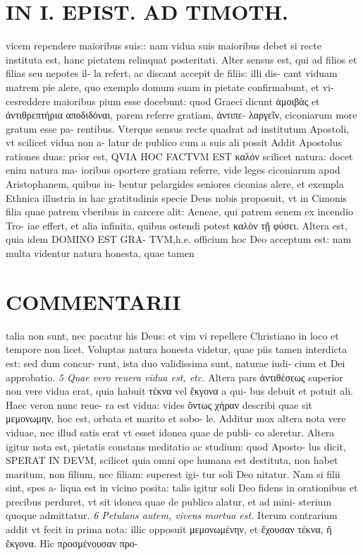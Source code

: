 \documentclass{article}
\begin{document}
\begin{pages}
\section*{IN I. EPIST. AD TIMOTH. }
\marginpar{[ p.123 ]}\pstart vicem rependere maioribus suis:: nam vidua suis maioribus debet si recte instituta est, hanc pietatem relinquat posteritati. Alter sensus est, qui ad filios et filias seu nepotes il- la refert, ac discant accepit de filiis: illi dis- cant viduam matrem pie alere, quo exemplo domum suam in pietate confirmabunt, et vi- cesreddere maioribus pium esse docebunt: quod Graeci dicunt ἁμοιβὰς et ἀντιθρεπτήρια αποδιδόναι, parem referre gratiam, ἀντιπε- λαργεῖν, ciconiarum more gratum esse pa- rentibus. Vterque sensus recte quadrat ad institutum Apostoli, vt scilicet vidua non a- latur de publico cum a suis ali possit  \pend\pstart Addit Apostolus rationes duas: prior est, QVIA HOC FACTVM EST καλόν scilicet natura: docet enim natura ma- ioribus oportere gratiam referre, vide leges ciconiarum apud Aristophanem, quibus iu- bentur pelargides seniores ciconias alere, et exempla Ethnica illustria in hac gratitudinis specie Deus nobis proposuit, vt in Cimonis filia quae patrem vberibus in carcere alit: Aeneae, qui patrem senem ex incendio Tro- iae effert, et alia infinita, quibus ostendi potest καλὸν τῇ φύσει.  \pend\pstart Altera est, quia idem DOMINO EST GRA- TVM,h.e. officium hoc Deo acceptum est: nam multa videntur natura honesta, quae tamen  \pend
\section*{COMMENTARII }
\marginpar{[ p.124 ]}\pstart talia non sunt, nec pacatur his Deus: et vim vi repellere Christiano in loco et tempore non licet. Voluptas natura honesta videtur, quae piis tamen interdicta est: sed dum concur- runt, ista duo validissima sunt, naturae iudi- cium et Dei approbatio.  \pend
\textit{5 Quae vero reuera vidua est, etc. }\pstart Altera pars ἀντιθέσεως superior non vere vidua erat, quia habuit τέκνα vel ἔκγονα a qui- bus debuit et potuit ali. Haec veron nunc reue- ra est vidua: vides ὄντως χήραν describi quae sit μεμονωμην, hoc est, orbata et marito et sobo- le. Additur mox altera nota vere viduae, nec illud satis erat vt esset idonea quae de publi- co aleretur. Altera igitur nota est, pietatis constans meditatio ac studium: quod Aposto- lus dicit, SPERAT IN DEVM, scilicet quia omni ope humana est destituta, non habet maritum, non filium, nec filiam: superest igi- tur soli Deo nitatur. Nam si filii sint, spes a- liqua est in vicino posita: talis igitur soli Deo fidens in orationibus et precibus perduret, vt sit idonea quae de publico alatur, et ad mini- sterium quoque admittatur.  \pend
\textit{6 Petulans autem, vivens mortua est. }\pstart Iterum contrarium addit vt fecit in prima nota: illic opposuit μεμονωμένην, et ἔχουσαν τέκνα, ἤ ἔκγονα.  Hîc προσμένουσαν προ-  \pend

\end{pages}
\end{document}
